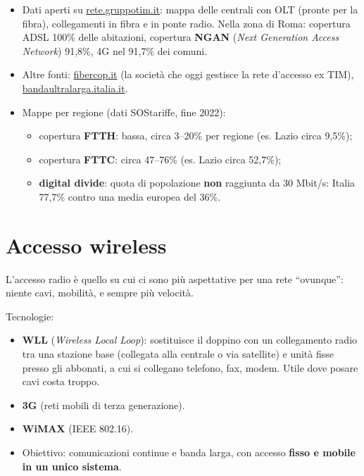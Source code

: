 \begin{itemize}
\tightlist
\item
  Dati aperti su \href{https://rete.gruppotim.it/}{rete.gruppotim.it}: mappa delle centrali con OLT (pronte per la fibra), collegamenti in fibra e in ponte radio. Nella zona di Roma: copertura ADSL 100\% delle abitazioni, copertura \textbf{NGAN} (\emph{Next Generation Access Network}) 91,8\%, 4G nel 91,7\% dei comuni.
\item
  Altre fonti: \href{https://www.fibercop.it/en/}{fibercop.it} (la società che oggi gestisce la rete d'accesso ex TIM), \href{https://bandaultralarga.italia.it/}{bandaultralarga.italia.it}.
\item
  Mappe per regione (dati SOStariffe, fine 2022):

  \begin{itemize}
  \tightlist
  \item
    copertura \textbf{FTTH}: bassa, circa 3--20\% per regione (es. Lazio circa 9,5\%);
  \item
    copertura \textbf{FTTC}: circa 47--76\% (es. Lazio circa 52,7\%);
  \item
    \textbf{digital divide}: quota di popolazione \textbf{non} raggiunta da 30 Mbit/s: Italia 77,7\% contro una media europea del 36\%.
  \end{itemize}
\end{itemize}

\section{Accesso wireless}

\begin{inbreve}

L'accesso radio è quello su cui ci sono più aspettative per una rete ``ovunque'': niente cavi, mobilità, e sempre più velocità.

\end{inbreve}

Tecnologie:

\begin{itemize}
\tightlist
\item
  \textbf{WLL} (\emph{Wireless Local Loop}): sostituisce il doppino con un collegamento radio tra una stazione base (collegata alla centrale o via satellite) e unità fisse presso gli abbonati, a cui si collegano telefono, fax, modem. Utile dove posare cavi costa troppo.
\item
  \textbf{3G} (reti mobili di terza generazione).
\item
  \textbf{WiMAX} (IEEE 802.16).
\item
  Obiettivo: comunicazioni continue e banda larga, con accesso \textbf{fisso e mobile in un unico sistema}.
\end{itemize}

